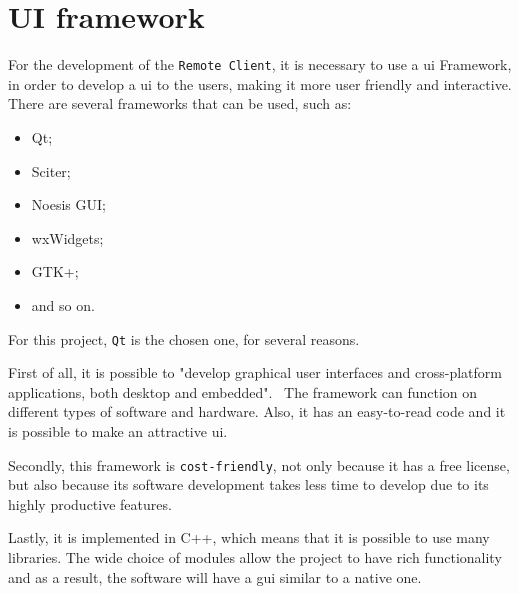 %
\section{UI framework}
\label{sec:ui-framework}

For the development of the \texttt{Remote Client}, it is necessary to use a \gls{ui} Framework, in order to develop a \gls{ui} to the users, making it more user friendly and interactive.
There are several frameworks that can be used, such as:

\begin{itemize}
\item Qt;
\item Sciter;
\item Noesis GUI;
\item wxWidgets;
\item GTK+;
\item and so on.
\end{itemize}

For this project, \texttt{Qt} is the chosen one, for several reasons.

First of all, it is possible to "develop graphical user interfaces and cross-platform applications, both desktop and embedded".~\cite{qt-bib} 
The framework can function on different types of software and hardware.
Also, it has an easy-to-read code and it is possible to make an attractive \gls{ui}.

Secondly, this framework is \texttt{cost-friendly}, not only because it has a free license, but also because its software development takes less time to develop due to its highly productive features.

Lastly, it is implemented in C++, which means that it is possible to use many libraries.
The wide choice of modules allow the project to have rich functionality and as a result, the software will have a \gls{gui} similar to a native one.
